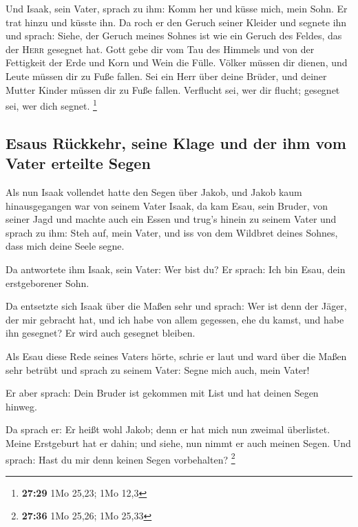  Und Isaak, sein Vater, sprach zu ihm: Komm her und küsse
mich, mein Sohn.  Er trat hinzu und küsste ihn. Da roch
er den Geruch seiner Kleider und segnete ihn und sprach: Siehe, der
Geruch meines Sohnes ist wie ein Geruch des Feldes, das der
\textsc{Herr} gesegnet hat.  Gott gebe dir vom Tau des
Himmels und von der Fettigkeit der Erde und Korn und Wein die Fülle.
 Völker müssen dir dienen, und Leute müssen dir zu Fuße
fallen. Sei ein Herr über deine Brüder, und deiner Mutter Kinder müssen
dir zu Fuße fallen. Verflucht sei, wer dir flucht; gesegnet sei, wer
dich segnet. \footnote{\textbf{27:29} 1Mo 25,23; 1Mo 12,3}

\hypertarget{esaus-ruxfcckkehr-seine-klage-und-der-ihm-vom-vater-erteilte-segen}{%
\subsection{Esaus Rückkehr, seine Klage und der ihm vom Vater erteilte
Segen}\label{esaus-ruxfcckkehr-seine-klage-und-der-ihm-vom-vater-erteilte-segen}}

 Als nun Isaak vollendet hatte den Segen über Jakob, und
Jakob kaum hinausgegangen war von seinem Vater Isaak, da kam Esau, sein
Bruder, von seiner Jagd  und machte auch ein Essen und
trug's hinein zu seinem Vater und sprach zu ihm: Steh auf, mein Vater,
und iss von dem Wildbret deines Sohnes, dass mich deine Seele segne.

 Da antwortete ihm Isaak, sein Vater: Wer bist du? Er
sprach: Ich bin Esau, dein erstgeborener Sohn.

 Da entsetzte sich Isaak über die Maßen sehr und sprach:
Wer ist denn der Jäger, der mir gebracht hat, und ich habe von allem
gegessen, ehe du kamst, und habe ihn gesegnet? Er wird auch gesegnet
bleiben.

 Als Esau diese Rede seines Vaters hörte, schrie er laut
und ward über die Maßen sehr betrübt und sprach zu seinem Vater: Segne
mich auch, mein Vater!

 Er aber sprach: Dein Bruder ist gekommen mit List und
hat deinen Segen hinweg.

 Da sprach er: Er heißt wohl Jakob; denn er hat mich nun
zweimal überlistet. Meine Erstgeburt hat er dahin; und siehe, nun nimmt
er auch meinen Segen. Und sprach: Hast du mir denn keinen Segen
vorbehalten? \footnote{\textbf{27:36} 1Mo 25,26; 1Mo 25,33}


